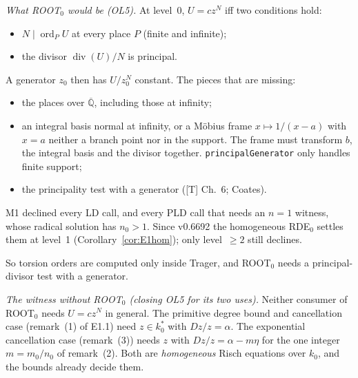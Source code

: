 \documentclass[11pt]{article}
\theoremstyle{definition}
\theoremstyle{remark}
\newcommand{\Qbar}{\overline{\mathbb{Q}}}
\newcommand{\code}[1]{\texttt{#1}}
\begin{document}
\noindent \emph{What ROOT$_0$ would be (OL5).} At level~0, $U=cz^N$ iff two conditions hold:
\begin{itemize}
\item $N\mid\operatorname{ord}_PU$ at every place $P$ (finite and infinite);
\item the divisor $\operatorname{div}(U)/N$ is principal.
\end{itemize}
A generator $z_0$ then has $U/z_0^N$ constant. The pieces that are missing:
\begin{itemize}
\item the places over $\Qbar$, including those at infinity;
\item an integral basis normal at infinity, or a M\"obius frame $x\mapsto1/(x-a)$ with $x=a$
  neither a branch point nor in the support. The frame must transform $b$, the integral basis
  and the divisor together. \code{principalGenerator} only handles finite support;
\item the principality test with a generator ([T] Ch.~6; Coates).
\end{itemize}
M1 declined every LD call, and every PLD call that needs an $n=1$ witness, whose radical
solution has $n_0>1$. Since v0.6692 the homogeneous RDE$_0$ settles them at level~1
(Corollary~\ref{cor:E1hom}); only level~$\ge2$ still declines.

So torsion orders are computed only inside Trager, and ROOT$_0$ needs a principal-divisor test
with a generator.

\noindent \emph{The witness without ROOT$_0$ (closing OL5 for its two uses).} Neither consumer
of ROOT$_0$ needs $U=cz^N$ in general. The primitive degree bound and cancellation case (remark~(1)
of E1.1) need $z\in k_0^*$ with $Dz/z=\alpha$. The exponential cancellation case (remark~(3)) needs
$z$ with $Dz/z=\alpha-m\eta$ for the one integer $m=m_0/n_0$ of remark~(2). Both are
\emph{homogeneous} Risch equations over $k_0$, and the bounds already decide them.
\end{document}
